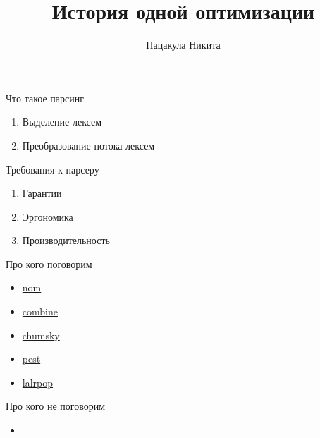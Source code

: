 \documentclass[aspectratio=169]{beamer}
\title{История одной оптимизации}
\author{Пацакула Никита}
\begin{document}
\begin{frame}
        \titlepage
\end{frame}

\begin{frame}{Что такое парсинг}
    \begin{enumerate}
        \item Выделение лексем
        \item Преобразование потока лексем 
    \end{enumerate}
\end{frame}

\begin{frame}{Требования к парсеру}
    \begin{enumerate}
        \item Гарантии
        \item Эргономика
        \item Производительность
    \end{enumerate}
\end{frame}

\begin{frame}{Про кого поговорим}
    \begin{itemize}
        \item \href{https://docs.rs/nom/latest/nom/}{nom}
        \item \href{https://docs.rs/combine/latest/combine/}{combine}
        \item \href{https://docs.rs/chumsky/latest/chumsky/}{chumsky}
        \item \href{https://docs.rs/pest/latest/pest/}{pest}
        \item \href{https://github.com/lalrpop/lalrpop}{lalrpop}
    \end{itemize}
\end{frame}

\begin{frame}{Про кого не поговорим}
    \begin{itemize}
        \item 
    \end{itemize}
\end{frame}
\end{document}
